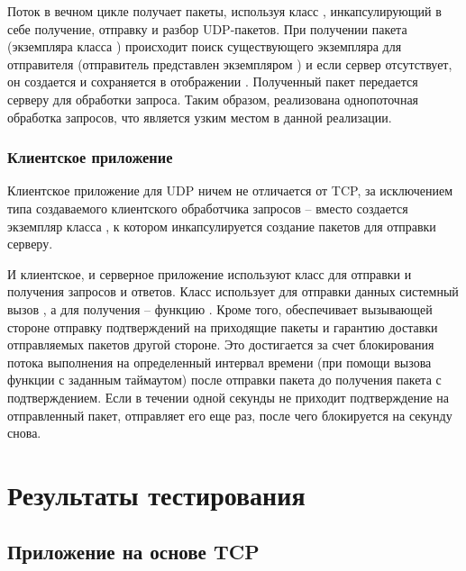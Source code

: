 Поток  в вечном цикле получает пакеты, используя класс , инкапсулирующий в себе получение, отправку и разбор UDP-пакетов. При получении пакета (экземпляра класса ) происходит поиск существующего экземпляра  для отправителя (отправитель представлен экземпляром ) и если сервер отсутствует, он создается и сохраняется в отображении . Полученный пакет передается серверу для обработки запроса. Таким образом, реализована однопоточная обработка запросов, что является узким местом в данной реализации.

\subsubsection{Клиентское приложение}

Клиентское приложение для UDP ничем не отличается от TCP, за исключением типа создаваемого клиентского обработчика запросов -- вместо  создается экземпляр класса , к котором инкапсулируется создание пакетов для отправки серверу.

И клиентское, и серверное приложение используют класс  для отправки и получения запросов и ответов. Класс  использует для отправки данных системный вызов , а для получения -- функцию . Кроме того,  обеспечивает вызывающей стороне отправку подтверждений на приходящие пакеты и гарантию доставки отправляемых пакетов другой стороне. Это достигается за счет блокирования потока выполнения на определенный интервал времени (при помощи вызова функции  с заданным таймаутом) после отправки пакета до получения пакета с подтверждением. Если в течении одной секунды не приходит подтверждение на отправленный пакет,  отправляет его еще раз, после чего блокируется на секунду снова.

\section{Результаты тестирования}


\subsection{Приложение на основе TCP}

